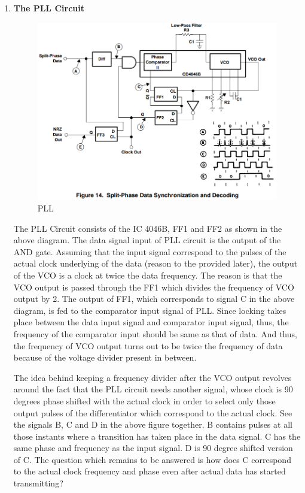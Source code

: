 \documentclass{article}
\begin{document}
\begin{enumerate}[label=(\Alph*)]
\item \textbf{The PLL Circuit}\\
    \begin{figure}[h]
    \includegraphics[scale=0.45]{images/PLL}
    \caption{PLL}
    \label{fig:PLL}
  \end{figure}

  The PLL Circuit consists of the IC 4046B, FF1 and FF2 as shown in the above diagram. The data signal input of PLL circuit is the output of the AND gate. Assuming that the input signal correspond to the pulses of the actual clock underlying of the data (reason to the provided later), the output of the VCO is a clock at twice the data frequency. The reason is that the VCO output is passed through the FF1 which divides the frequency of VCO output by 2. The output of FF1, which corresponds to signal C in the above diagram, is fed to the comparator input signal of PLL. Since locking takes place between the data input signal and comparator input signal, thus, the frequency of the comparator input should be same as that of data. And thus, the frequency of VCO output turns out to be twice the frequency of data because of the voltage divider present in between.

  The idea behind keeping a frequency divider after the VCO output revolves around the fact that the PLL circuit needs another signal, whose clock is 90 degrees phase shifted with the actual clock in order to select only those output pulses of the differentiator which correspond to the actual clock. See the signals B, C and D in the above figure together. B contains pulses at all those instants where a transition has taken place in the data signal. C has the same phase and frequency as the input signal. D is 90 degree shifted version of C. The question which remains to be answered is how does C correspond to the actual clock frequency and phase even after actual data has started transmitting?
  

\end{enumerate}
\end{document}
